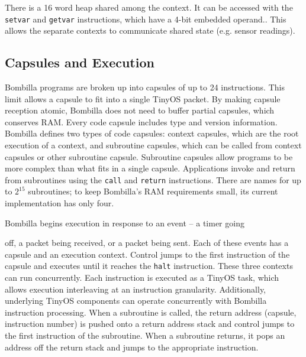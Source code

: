 \documentclass[10pt]{article}
\newcommand{\bomb}{Bombilla\xspace}
\begin{document}
There is a 16 word heap shared among the context. It can be accessed
with the {\tt setvar} and {\tt getvar} instructions, which have a
4-bit embedded operand.. This allows the separate contexts to
communicate shared state (e.g. sensor readings).

\subsection{Capsules and Execution}


\bomb programs are broken up into capsules of up to 24
instructions. This limit allows a capsule to fit into a single TinyOS
packet. By making capsule reception atomic, \bomb does not need to
buffer partial capsules, which conserves RAM. Every code capsule
includes type and version information. \bomb defines two types of code
capsules: context capsules, which are the root execution of a context,
and subroutine capsules, which can be called from context capsules or
other subroutine capsule. Subroutine capsules allow programs to be
more complex than what fits in a single capsule. Applications invoke
and return from subroutines using the {\tt call} and {\tt return}
instructions. There are names for up to $2^{15}$ subroutines; to keep
\bomb's RAM requirements small, its current implementation has only
four.



\bomb begins execution in response to an event -- a timer going

off, a packet being received, or a packet being sent. Each of these
events has a capsule and an execution context. Control jumps to the
first instruction of the capsule and executes until it reaches the
{\tt halt} instruction. These three contexts can run
concurrently. Each instruction is executed as a TinyOS task, which
allows execution interleaving at an instruction
granularity. Additionally, underlying TinyOS components can operate
concurrently with \bomb instruction processing. When a subroutine is
called, the return address (capsule, instruction number) is pushed
onto a return address stack and control jumps to the first instruction
of the subroutine. When a subroutine returns, it pops an address off
the return stack and jumps to the appropriate instruction.
\end{document}
